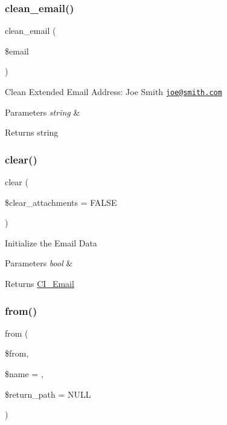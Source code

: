 \subsubsection{\texorpdfstring{clean\+\_\+email()}{clean\_email()}}
{\footnotesize\ttfamily clean\+\_\+email (\begin{DoxyParamCaption}\item[{}]{\$email }\end{DoxyParamCaption})}

Clean Extended Email Address\+: Joe Smith \href{mailto:joe@smith.com}{\tt joe@smith.\+com}


\begin{DoxyParams}{Parameters}
{\em string} & \\
\hline
\end{DoxyParams}
\begin{DoxyReturn}{Returns}
string 
\end{DoxyReturn}
\mbox{\label{class_c_i___email_a84399b20dfff67877099743270c68538}} 
\subsubsection{\texorpdfstring{clear()}{clear()}}
{\footnotesize\ttfamily clear (\begin{DoxyParamCaption}\item[{}]{\$clear\+\_\+attachments = {\ttfamily FALSE} }\end{DoxyParamCaption})}

Initialize the Email Data


\begin{DoxyParams}{Parameters}
{\em bool} & \\
\hline
\end{DoxyParams}
\begin{DoxyReturn}{Returns}
\mbox{\hyperlink{class_c_i___email}{C\+I\+\_\+\+Email}} 
\end{DoxyReturn}
\mbox{\label{class_c_i___email_adfec40d06e4f3fcae4e2059dee1c26d0}} 
\subsubsection{\texorpdfstring{from()}{from()}}
{\footnotesize\ttfamily from (\begin{DoxyParamCaption}\item[{}]{\$from,  }\item[{}]{\$name = {\ttfamily \textquotesingle{}\textquotesingle{}},  }\item[{}]{\$return\+\_\+path = {\ttfamily NULL} }\end{DoxyParamCaption})}

